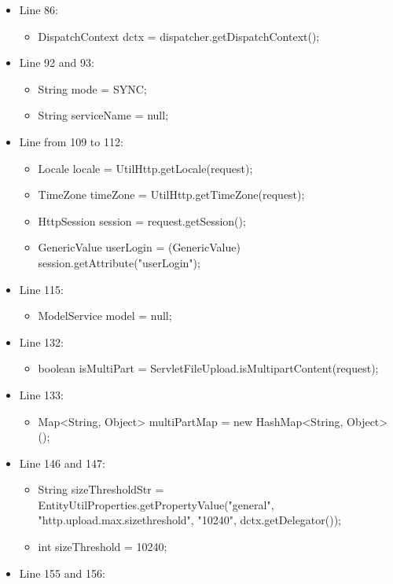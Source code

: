 \documentclass{article}
\begin{document}
\begin{itemize}[noitemsep]
\item Line 86:
\begin{itemize}[noitemsep]
\item DispatchContext dctx = dispatcher.getDispatchContext();\\
\end{itemize}
\item Line 92 and 93:
\begin{itemize}[noitemsep]
\item String mode = SYNC;
\item String serviceName = null; 
\end{itemize}   
\item Line from 109 to 112:
\begin{itemize}[noitemsep]
\item Locale locale = UtilHttp.getLocale(request);
\item TimeZone timeZone = UtilHttp.getTimeZone(request);
\item HttpSession session = request.getSession();
\item GenericValue userLogin = (GenericValue) session.getAttribute("userLogin"); 
\end{itemize} 
\item Line 115:
\begin{itemize}[noitemsep]
\item ModelService model = null;
\end{itemize} 
\item Line 132: 
\begin{itemize}[noitemsep]
\item boolean isMultiPart = ServletFileUpload.isMultipartContent(request);
\end{itemize}  
\item Line 133:
\begin{itemize}[noitemsep]
\item Map<String, Object> multiPartMap = new HashMap<String, Object>();
\end{itemize}
\item Line 146 and 147:
\begin{itemize}[noitemsep]
\item  String sizeThresholdStr = EntityUtilProperties.getPropertyValue("general", "http.upload.max.sizethreshold", "10240", dctx.getDelegator());
\item int sizeThreshold = 10240; 
\end{itemize}  
\item Line 155 and 156: 

\end{itemize}
\end{document}

